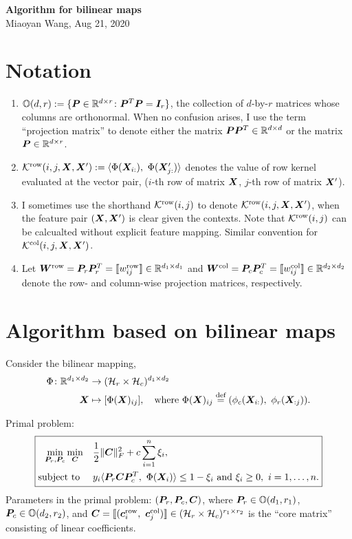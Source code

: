 \documentclass[11pt]{article}
\theoremstyle{plain}
\theoremstyle{definition}
\begin{document}
\begin{center}
{\bf \Large Algorithm for bilinear maps}\\
Miaoyan Wang, Aug 21, 2020\\
\end{center}
\section{Notation} 
\begin{enumerate}
\item $\mathbb{O}(d,r):=\{\bm{P}\in\mathbb{R}^{d\times r}\colon \bm{P}^T\bm{P}=\bm I_r\}$, the collection of $d$-by-$r$ matrices whose columns are orthonormal. When no confusion arises, I use the term ``projection matrix'' to denote either the matrix $\bm{P}\bm{P}^T\in\mathbb{R}^{d\times d}$ or the matrix $\bm{P}\in\mathbb{R}^{d\times r}$.
\item $\mathcal{K}^{\text{row}}(i,j,\bm X,\bm X') : =\langle \Phi(\bm X_{i:}),\ \Phi(\bm X'_{j:}) \rangle $ denotes the value of row kernel evaluated at the vector pair, ($i$-th row of matrix $\bm X$, $j$-th row of matrix $\bm X'$). 
\item I sometimes use the shorthand $\mathcal{K}^{\text{row}}(i,j)$ to denote $\mathcal{K}^{\text{row}}(i,j,\bm X,\bm X')$, when the feature pair $(\bm X, \bm X')$ is clear given the contexts. Note that $\mathcal{K}^{\text{row}}(i,j)$ can be calcualted without explicit feature mapping. Similar convention for $\mathcal{K}^{\text{col}}(i,j,\bm X,\bm X')$.
\item Let $\bm{W}^{\text{row}}=\bm{P}_r\bm{P}^T_r=\llbracket w^{\text{row}}_{ij} \rrbracket\in\mathbb{R}^{d_1\times d_1}$ and $\bm{W}^{\text{col}}=\bm{P}_c\bm{P}^T_c=\llbracket w^{\text{col}}_{ij} \rrbracket\in\mathbb{R}^{d_2\times d_2}$ denote the row- and column-wise projection matrices, respectively.
\end{enumerate}

\section{Algorithm based on bilinear maps}
Consider the bilinear mapping,
\begin{align}
\Phi\colon \mathbb{R}^{d_1\times d_2}& \to (\tH_r\times \tH_c)^{d_1\times d_2}\\
\mX& \mapsto [\Phi(\mX)_{ij}],\quad \text{where}\ \Phi(\mX)_{ij}\stackrel{\text{def}}{=}(\phi_c(\mX_{i:}),\ \phi_r(\mX_{:j})).
\end{align}

Primal problem:
\begin{equation}
\boxed{
\begin{aligned}\label{eq:opt}
\min_{\mP_r, \mP_c}\min_{\mC}&\quad {1\over 2}\FnormSize{}{\mC}^2 + c\sum_{i=1}^ n \xi_i,\\
\text{subject to }&\quad y_i\langle \mP_r\mC\mP_c^T,\ \Phi(\mX_i)\rangle \leq 1-\xi_i \text{ and}\ \xi_i\geq 0,\ i=1,\ldots,n.
\end{aligned}
}
\end{equation}
Parameters in the primal problem: $(\bm{P}_r, \bm{P}_c, \bm C)$, where $\bm{P}_r\in\mathbb{O}(d_1,r_1)$, $\bm{P}_c\in\mathbb{O}(d_2,r_2)$, and $\mC=\entry{(\mc^{\text{row}}_i,\ \mc^{\text{col}}_j)} \in (\tH_r\times \tH_c)^{r_1\times r_2}$ is the ``core matrix'' consisting of linear coefficients. 
\end{document}

